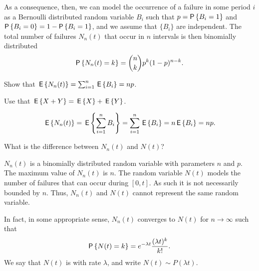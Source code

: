 As a consequence, then, we can model the occurrence of a failure in
some period $i$ as a Bernoulli distributed random variable $B_i$ such
that $p=\P{B_i =1}$ and $\P{B_i=0} = 1-\P{B_i = 1}$, and we assume that
$\{B_i\}$ are independent. The total number of failures $N_n(t)$ that
occur in $n$ intervals is then binomially distributed
\begin{equation}\label{eq:bin}
  \P{N_n(t) = k} = {n \choose k} p^k (1-p)^{n-k}.
\end{equation}

\begin{exercise}
Show that $\,\mathsf{E}\left\{N_n(t)\right\} = \sum_{i=1}^n \,\mathsf{E}\left\{B_i\right\} = n p$.
\begin{hint}
Use that $\,\mathsf{E}\left\{X+Y\right\} = \,\mathsf{E}\left\{X\right\} + \,\mathsf{E}\left\{Y\right\}$. 
\end{hint}
\begin{solution}
  \begin{equation*}
    \,\mathsf{E}\left\{N_n(t)\right\} = \,\mathsf{E}\left\{\sum_{i=1}^n {B_i}\right\} = \sum_{i=1}^n \,\mathsf{E}\left\{B_i\right\} = n \,\mathsf{E}\left\{B_i\right\} = n p.
  \end{equation*}
\end{solution}
\end{exercise}

\begin{exercise}
What is the difference between $N_n(t)$ and $N(t)$?
\begin{solution}
  $N_n(t)$ is a binomially distributed random variable with parameters
  $n$ and $p$. The maximum value of $N_n(t)$ is $n$. The random
  variable $N(t)$ models the number of failures that can occur during
  $[0,t]$. As such it is not necessarily bounded by $n$. Thus, $N_n(t)$ and $N(t)$ cannot represent the same random variable. 
\end{solution}
\end{exercise}


In fact, in some appropriate sense, $N_n(t)$ converges to $N(t)$ for $n\to \infty$ such
that
\begin{equation}\label{eq:pois}
  \P{N(t) = k} = 
e^{-\lambda t} \frac{(\lambda t)^k}{k!}.
\end{equation}
We say that $N(t)$ is  with rate
$\lambda$, and write $N(t)\sim P(\lambda t)$. 

